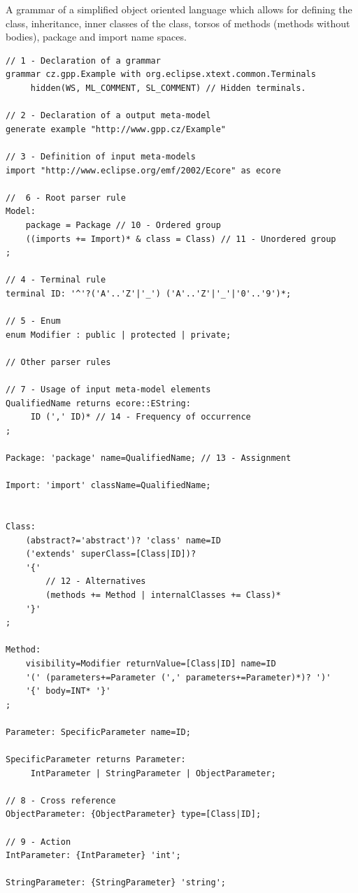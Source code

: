 \documentclass[12pt,notitlepage,a4paper]{report}
\begin{document}
\begin{expl}\label{grammar}A grammar of a simplified object oriented language which allows for defining the class, inheritance, inner classes of the class, torsos of methods (methods without bodies), package and import name spaces.

\begingroup
\fontsize{10pt}{12pt}
\begin{verbatim}
// 1 - Declaration of a grammar 
grammar cz.gpp.Example with org.eclipse.xtext.common.Terminals
     hidden(WS, ML_COMMENT, SL_COMMENT) // Hidden terminals.

// 2 - Declaration of a output meta-model
generate example "http://www.gpp.cz/Example"

// 3 - Definition of input meta-models 
import "http://www.eclipse.org/emf/2002/Ecore" as ecore

//  6 - Root parser rule 
Model:
    package = Package // 10 - Ordered group 
    ((imports += Import)* & class = Class) // 11 - Unordered group 
;

// 4 - Terminal rule
terminal ID: '^'?('A'..'Z'|'_') ('A'..'Z'|'_'|'0'..'9')*;

// 5 - Enum
enum Modifier : public | protected | private;

// Other parser rules

// 7 - Usage of input meta-model elements
QualifiedName returns ecore::EString:
     ID (',' ID)* // 14 - Frequency of occurrence
;

Package: 'package' name=QualifiedName; // 13 - Assignment

Import: 'import' className=QualifiedName; 


Class:
    (abstract?='abstract')? 'class' name=ID
    ('extends' superClass=[Class|ID])?
    '{'
        // 12 - Alternatives 
        (methods += Method | internalClasses += Class)*
    '}'
;

Method:
    visibility=Modifier returnValue=[Class|ID] name=ID
    '(' (parameters+=Parameter (',' parameters+=Parameter)*)? ')'
    '{' body=INT* '}'
;

Parameter: SpecificParameter name=ID;

SpecificParameter returns Parameter:
     IntParameter | StringParameter | ObjectParameter;

// 8 - Cross reference
ObjectParameter: {ObjectParameter} type=[Class|ID];

// 9 - Action
IntParameter: {IntParameter} 'int';

StringParameter: {StringParameter} 'string';
\end{verbatim}
\endgroup
\end{expl}
\end{document}
